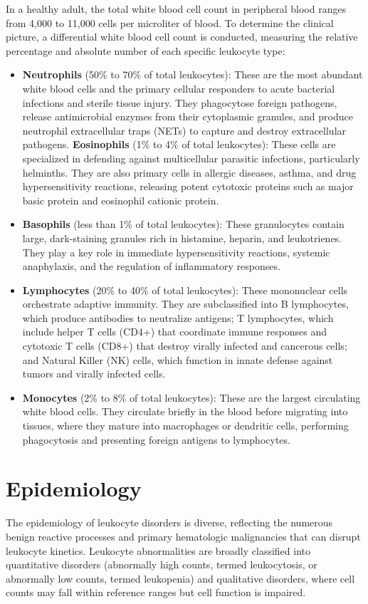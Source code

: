 In a healthy adult, the total white blood cell count in peripheral blood ranges from 4,000 to 11,000 cells per microliter of blood. To determine the clinical picture, a differential white blood cell count is conducted, measuring the relative percentage and absolute number of each specific leukocyte type:
\begin{itemize}
  \item \textbf{Neutrophils} (50\% to 70\% of total leukocytes): These are the most abundant white blood cells and the primary cellular responders to acute bacterial infections and sterile tissue injury. They phagocytose foreign pathogens, release antimicrobial enzymes from their cytoplasmic granules, and produce neutrophil extracellular traps (NETs) to capture and destroy extracellular pathogens.
  \textbf{Eosinophils} (1\% to 4\% of total leukocytes): These cells are specialized in defending against multicellular parasitic infections, particularly helminths. They are also primary cells in allergic diseases, asthma, and drug hypersensitivity reactions, releasing potent cytotoxic proteins such as major basic protein and eosinophil cationic protein.
  \item \textbf{Basophils} (less than 1\% of total leukocytes): These granulocytes contain large, dark-staining granules rich in histamine, heparin, and leukotrienes. They play a key role in immediate hypersensitivity reactions, systemic anaphylaxis, and the regulation of inflammatory responses.
  \item \textbf{Lymphocytes} (20\% to 40\% of total leukocytes): These mononuclear cells orchestrate adaptive immunity. They are subclassified into B lymphocytes, which produce antibodies to neutralize antigens; T lymphocytes, which include helper T cells (CD4+) that coordinate immune responses and cytotoxic T cells (CD8+) that destroy virally infected and cancerous cells; and Natural Killer (NK) cells, which function in innate defense against tumors and virally infected cells.
  \item \textbf{Monocytes} (2\% to 8\% of total leukocytes): These are the largest circulating white blood cells. They circulate briefly in the blood before migrating into tissues, where they mature into macrophages or dendritic cells, performing phagocytosis and presenting foreign antigens to lymphocytes.
\end{itemize}

\section*{Epidemiology}
The epidemiology of leukocyte disorders is diverse, reflecting the numerous benign reactive processes and primary hematologic malignancies that can disrupt leukocyte kinetics. Leukocyte abnormalities are broadly classified into quantitative disorders (abnormally high counts, termed leukocytosis, or abnormally low counts, termed leukopenia) and qualitative disorders, where cell counts may fall within reference ranges but cell function is impaired.

